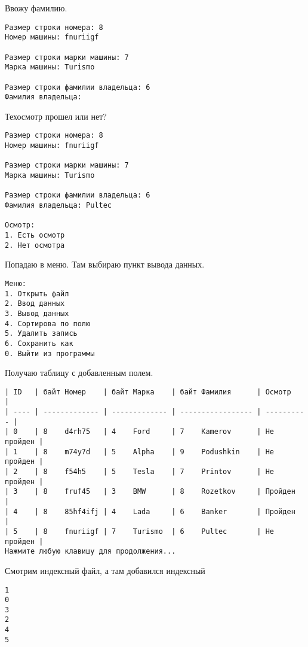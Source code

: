 Ввожу фамилию.

\begin{tcolorbox}
\begin{verbatim}
Размер строки номера: 8  
Номер машины: fnuriigf

Размер строки марки машины: 7
Марка машины: Turismo

Размер строки фамилии владельца: 6
Фамилия владельца:
\end{verbatim}
\end{tcolorbox}

Техосмотр прошел или нет?

\begin{tcolorbox}
\begin{verbatim}
Размер строки номера: 8  
Номер машины: fnuriigf

Размер строки марки машины: 7
Марка машины: Turismo

Размер строки фамилии владельца: 6
Фамилия владельца: Pultec

Осмотр:       
1. Есть осмотр
2. Нет осмотра
\end{verbatim}
\end{tcolorbox}

Попадаю в меню. Там выбираю пункт вывода данных.

\begin{tcolorbox}
\begin{verbatim}
Меню:
1. Открыть файл
2. Ввод данных
3. Вывод данных
4. Сортирова по полю
5. Удалить запись
6. Сохранить как
0. Выйти из программы
\end{verbatim}
\end{tcolorbox}
    
Получаю таблицу с добавленным полем.

\begin{tcolorbox}
\begin{verbatim}
| ID   | байт Номер    | байт Марка    | байт Фамилия      | Осмотр     | 
| ---- | ------------- | ------------- | ----------------- | ---------- | 
| 0    | 8    d4rh75   | 4    Ford     | 7    Kamerov      | Не пройден | 
| 1    | 8    m74y7d   | 5    Alpha    | 9    Podushkin    | Не пройден | 
| 2    | 8    f54h5    | 5    Tesla    | 7    Printov      | Не пройден | 
| 3    | 8    fruf45   | 3    BMW      | 8    Rozetkov     | Пройден    | 
| 4    | 8    85hf4ifj | 4    Lada     | 6    Banker       | Пройден    | 
| 5    | 8    fnuriigf | 7    Turismo  | 6    Pultec       | Не пройден | 
Нажмите любую клавишу для продолжения...
\end{verbatim}
\end{tcolorbox}

Смотрим индексный файл, а там добавился индексный

\begin{tcolorbox}
\begin{verbatim}
1
0
3
2
4
5
\end{verbatim}
\end{tcolorbox}

